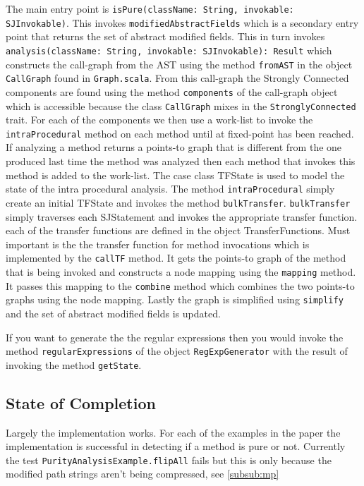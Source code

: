\documentclass[11pt]{exam}
\begin{document}
The main entry point is \texttt{isPure(className: String, invokable:
SJInvokable)}. This invokes \texttt{modifiedAbstractFields} which is a
secondary entry point that returns the set of abstract modified
fields. This in turn invokes \texttt{analysis(className: String,
invokable: SJInvokable): Result} which constructs the call-graph from
the AST using the method \texttt{fromAST} in the object
\texttt{CallGraph} found in \texttt{Graph.scala}. From this call-graph
the Strongly Connected components are found using the method
\texttt{components} of the call-graph object which is accessible
because the class \texttt{CallGraph}  mixes in the
\texttt{StronglyConnected} trait.  For each of the components we then
use a work-list to invoke the  \texttt{intraProcedural} method on each method
until at fixed-point has  been reached. If analyzing a method returns
a points-to graph that is different from the one produced last time
the method was analyzed then each method that invokes this method is
added to the work-list. The case class TFState is used to model the
state of the intra procedural analysis. The method
\texttt{intraProcedural} simply create an initial  TFState and invokes
the method \texttt{bulkTransfer}. \texttt{bulkTransfer} simply
traverses each SJStatement and invokes the appropriate transfer
function. each of the transfer functions are defined in the object
TransferFunctions. Must important is the the transfer function for method
invocations which is implemented by the \texttt{callTF} method. It gets the
points-to graph of the method that is being invoked and constructs a node
mapping using the \texttt{mapping} method. It passes this mapping to the
\texttt{combine} method which combines the two points-to graphs using the
node mapping. Lastly the graph is simplified using \texttt{simplify} and
the set of abstract modified fields is updated. \newline

If you want to generate the the regular expressions then you would
invoke the method \texttt{regularExpressions} of the object
\texttt{RegExpGenerator} with the result of invoking the method
\texttt{getState}.


\newpage

\subsection{State of Completion}

Largely the implementation works. For each of the examples in the
paper the implementation is successful in detecting if a method is
pure or not. Currently the test \texttt{PurityAnalysisExample.flipAll}
fails but this is only because the modified path strings aren't being
compressed, see \ref{subsub:mp}
\end{document}
